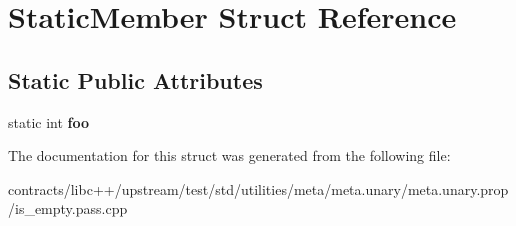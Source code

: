 \hypertarget{struct_static_member}{}\section{Static\+Member Struct Reference}
\label{struct_static_member}
\subsection*{Static Public Attributes}
\begin{DoxyCompactItemize}
\item 
\mbox{\label{struct_static_member_a1c15faf83c94a427f1d7c5ab880904f6}} 
static int {\bfseries foo}
\end{DoxyCompactItemize}


The documentation for this struct was generated from the following file\+:\begin{DoxyCompactItemize}
\item 
contracts/libc++/upstream/test/std/utilities/meta/meta.\+unary/meta.\+unary.\+prop/is\+\_\+empty.\+pass.\+cpp\end{DoxyCompactItemize}
